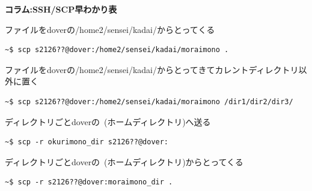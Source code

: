 \documentclass[a4j]{ltjreport}
\begin{document}
\begin{itembox}[l]{\textbf{コラム:SSH/SCP早わかり表}}
\begin{itemize}
            ファイルをdoverの/home2/sensei/kadai/からとってくる
            \begin{lstlisting}[numbers=none]
    ~$ scp s2126??@dover:/home2/sensei/kadai/moraimono .
            \end{lstlisting}
            ファイルをdoverの/home2/sensei/kadai/からとってきてカレントディレクトリ以外に置く
            \begin{lstlisting}[numbers=none]
    ~$ scp s2126??@dover:/home2/sensei/kadai/moraimono /dir1/dir2/dir3/
            \end{lstlisting}
            ディレクトリごとdoverの~(ホームディレクトリ)へ送る
            \begin{lstlisting}[numbers=none]
    ~$ scp -r okurimono_dir s2126??@dover:
            \end{lstlisting}
            ディレクトリごとdoverの~(ホームディレクトリ)からとってくる
            \begin{lstlisting}[numbers=none]
    ~$ scp -r s2126??@dover:moraimono_dir .
            \end{lstlisting}
        \end{itemize}
    \end{itembox}
\end{document}
